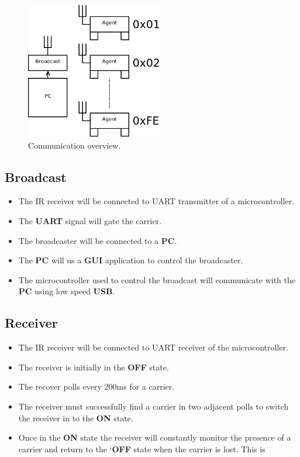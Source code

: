 \documentclass[a4paper]{article}
\begin{document}
\begin{figure}[h]
   \centering
   \label{fig_communications}
   \includegraphics[width=6cm,keepaspectratio]{communications/communications.png} 
   \caption{Communication overview.}
\end{figure}

   \subsection{Broadcast}
      \begin{itemize}
         \item The IR receiver will be connected to UART transmitter of a microcontroller. 
         \item The \textbf{UART} signal will gate the carrier.
         \item The broadcaster will be connected to a \textbf{PC}.
         \item The \textbf{PC} will us a \textbf{GUI} application to control the broadcaster.
         \item The microcontroller used to control the broadcast will communicate
               with the \textbf{PC} using low speed \textbf{USB}.
      \end{itemize}

 
   
   \subsection{Receiver}
      \begin{itemize}
         \item The IR receiver will be connected to UART receiver of the microcontroller. 
         \item The receiver is initially in the \textbf{OFF} state. 
         \item The recover polls every 200ms for a carrier.
         \item The receiver must successfully find a carrier in two adjacent polls to switch the 
               receiver in to the \textbf{ON} state.
         \item Once in the \textbf{ON} state the receiver will constantly monitor the presence 
               of a carrier and return to the `\textbf{OFF} state when the carrier is lost. 
               This is 
      \end{itemize}
\end{document}
